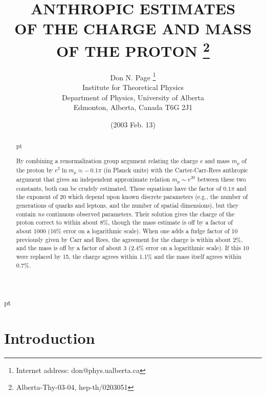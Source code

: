 \documentclass[a4paper,12pt]{article}
\begin{document}
\title{{\bf ANTHROPIC ESTIMATES
\\ OF THE CHARGE AND MASS OF THE PROTON}
\thanks{Alberta-Thy-03-04, hep-th/0203051}}
\author{
Don N. Page
\thanks{Internet address:
don@phys.ualberta.ca}
\\
Institute for Theoretical Physics\\
Department of Physics, University of Alberta\\
Edmonton, Alberta, Canada T6G 2J1
}
\date{(2003 Feb. 13)}
\maketitle
\large

\begin{abstract}
 pt

	By combining a renormalization group argument
relating the charge $e$ and mass $m_p$ of the proton
by $e^2 \ln{m_p} \approx -\,0.1\pi$ (in Planck units)
with the Carter-Carr-Rees anthropic argument that gives
an independent approximate relation $m_p \sim e^{20}$
between these two constants, both can be crudely estimated.
These equations have the factor of $0.1\pi$ and the exponent of 20
which depend upon known discrete parameters
(e.g., the number of generations of quarks and leptons,
and the number of spatial dimensions),
but they contain {\it no} continuous observed parameters.
Their solution gives the charge of the proton correct to within about 8\%,
though the mass estimate is off by a factor of about 1000
(16\% error on a logarithmic scale).
When one adds a fudge factor of 10 previously given by Carr and Rees,
the agreement for the charge is within about 2\%,
and the mass is off by a factor of about 3
(2.4\% error on a logarithmic scale).
If this 10 were replaced by 15, the charge agrees
within 1.1\% and the mass itself agrees within 0.7\%.


\end{abstract}
\normalsize
 pt
\newpage

\section{Introduction}
\end{document}
